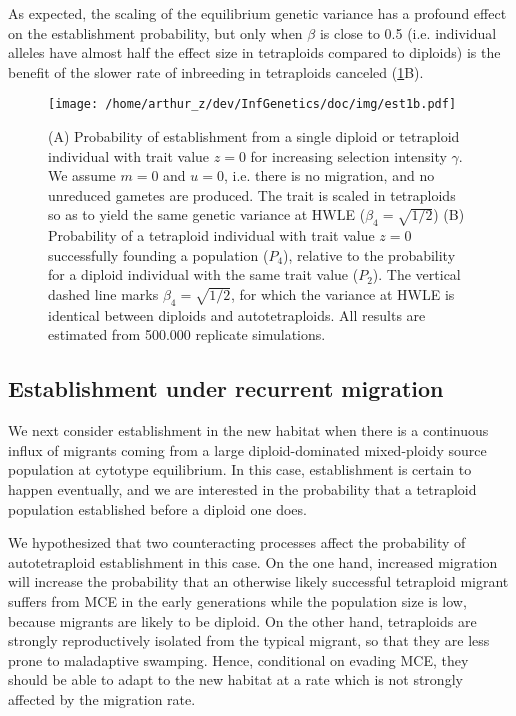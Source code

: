 \documentclass[11pt,a4paper]{article}
\begin{document}
As expected, the scaling of the equilibrium genetic variance has a profound
effect on the establishment probability, but only when $\beta$ is close to 0.5
(i.e. individual alleles have almost half the effect size in tetraploids
compared to diploids) is the benefit of the slower rate of inbreeding in
tetraploids canceled (\cref{fig:est1}B).


\begin{figure}[t]
\centering
\texttt{[image: /home/arthur\_z/dev/InfGenetics/doc/img/est1b.pdf]}
\caption{
(A) Probability of establishment from a single diploid or tetraploid individual
with trait value $z=0$ for increasing selection intensity $\gamma$.
We assume $m=0$ and $u=0$, i.e. there is no migration, and no unreduced
gametes are produced. The trait is scaled in tetraploids so as to yield the
same genetic variance at HWLE ($\beta_4 = \sqrt{1/2}$)
(B) Probability of a tetraploid individual with trait value $z = 0$
successfully founding a population ($P_4$), relative to the probability for a
diploid individual with the same trait value ($P_2$).
The vertical dashed line marks $\beta_4=\sqrt{1/2}$, for which the variance at
HWLE is identical between diploids and autotetraploids.
All results are estimated from 500.000 replicate simulations.
\label{fig:est1}}
\end{figure}


\subsection*{Establishment under recurrent migration}

We next consider establishment in the new habitat when there is a continuous
influx of migrants coming from a large diploid-dominated mixed-ploidy source
population at cytotype equilibrium.
In this case, establishment is certain to happen eventually, and we are
interested in the probability that a tetraploid population established before a
diploid one does.

We hypothesized that two counteracting processes affect the probability of
autotetraploid establishment in this case.
On the one hand, increased migration will increase the probability that an
otherwise likely successful tetraploid migrant suffers from MCE in the early
generations while the population size is low, because migrants are likely to be
diploid.
On the other hand, tetraploids are strongly reproductively isolated from
the typical migrant, so that they are less prone to maladaptive swamping.
Hence, conditional on evading MCE, they should be able to adapt to the new
habitat at a rate which is not strongly affected by the migration rate.
\end{document}
